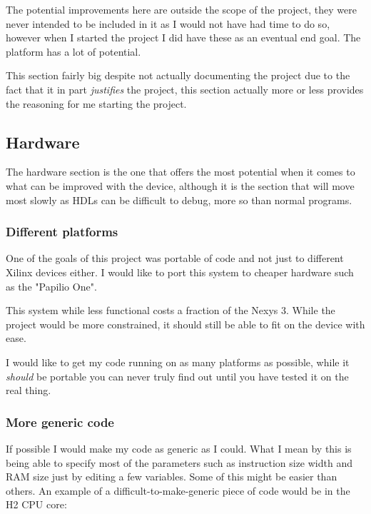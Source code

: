 \documentclass	[a4paper, 10pt]	{article}
\newcommand{\findcite}[1]{
  \par
  \begin{center}
  \framebox[\textwidth]{
    \textcolor{red}{\emph{Find Citation on:} \textsc{#1}}
  }
  \end{center}
  \par
}
\begin{document}
    The potential improvements here are outside the scope of the project, they were never
    intended to be included in it as I would not have had time to do so, however when I
    started the project I did have these as an eventual end goal. The platform has a lot of
    potential.

    This section fairly big despite not actually documenting the project due to the fact
    that it in part \emph{justifies} the project, this section actually more or less provides
    the reasoning for me starting the project.

    \subsection{Hardware}

      The hardware section is the one that offers the most potential when it comes to
      what can be improved with the device, although it is the section that will move
      most slowly as HDLs can be difficult to debug, more so than normal programs.

      \subsubsection{Different platforms}
      One of the goals of this project was portable of code and not just to different
      Xilinx devices either. I would like to port this system to cheaper hardware
      such as the "Papilio One". \findcite{http://papilio.cc/} This system while less
      functional costs a fraction of the Nexys 3. While the project would be more
      constrained, it should still be able to fit on the device with ease.

      I would like to get my code running on as many platforms as possible, while it
      \emph{should} be portable you can never truly find out until you have tested
      it on the real thing.

      \subsubsection{More generic code}

        If possible I would make my code as generic as I could. What I mean by this
        is being able to specify most of the parameters such as instruction size
        width and RAM size just by editing a few variables. Some of this might be
        easier than others. An example of a difficult-to-make-generic piece of code
        would be in the H2 CPU core:
\end{document}
